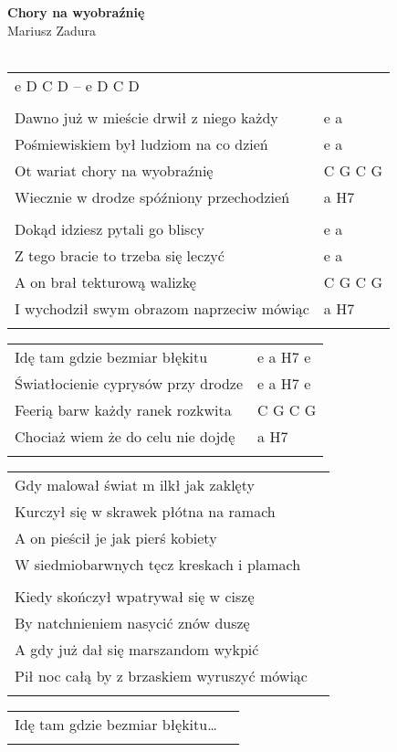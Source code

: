 \documentclass[a5paper]{article}
\begin{document}


\noindent
\fontsize{12pt}{15pt}\selectfont
\textbf{Chory na wyobraźnię} \\
\fontsize{8pt}{10pt}\selectfont
Mariusz Zadura \\ \\
\fontsize{10pt}{12pt}\selectfont
{}
\begin{tabular}{@{}p{9.5cm}p{3cm}@{}}
\noindent
e D C D -- e D C D	\\ \\

Dawno już w mieście drwił z niego każdy & e a \\
Pośmiewiskiem był ludziom na co dzień & e a \\
Ot wariat chory na wyobraźnię & C G C G \\
Wiecznie w drodze spóźniony przechodzień & a H7 \\ \\

Dokąd idziesz pytali go bliscy & e a \\
Z tego bracie to trzeba się leczyć & e a \\
A on brał tekturową walizkę & C G C G \\
I wychodził swym obrazom naprzeciw mówiąc & a H7 \\ \\
\end{tabular}

\noindent
\begin{tabular}{@{}p{8.5cm}p{3cm}@{}}
Idę tam gdzie bezmiar błękitu & e a H7 e \\
Światłocienie cyprysów przy drodze & e a H7 e \\
Feerią barw każdy ranek rozkwita & C G C G \\
Chociaż wiem że do celu nie dojdę & a H7 \\ \\
\end{tabular}

\noindent
\begin{tabular}{@{}p{9.5cm}p{3cm}@{}}
Gdy malował świat m	ilkł jak zaklęty \\
Kurczył się w skrawek płótna na ramach \\
A on pieścił je jak pierś kobiety \\
W siedmiobarwnych tęcz kreskach i plamach \\ \\

Kiedy skończył wpatrywał się w ciszę \\
By natchnieniem nasycić znów duszę \\
A gdy już dał się marszandom wykpić \\
Pił noc całą by z brzaskiem wyruszyć mówiąc \\ \\
\end{tabular}

\noindent
\begin{tabular}{@{}p{8.5cm}p{3cm}@{}}
Idę tam gdzie bezmiar błękitu… \\ \\
\end{tabular}
\end{document}
